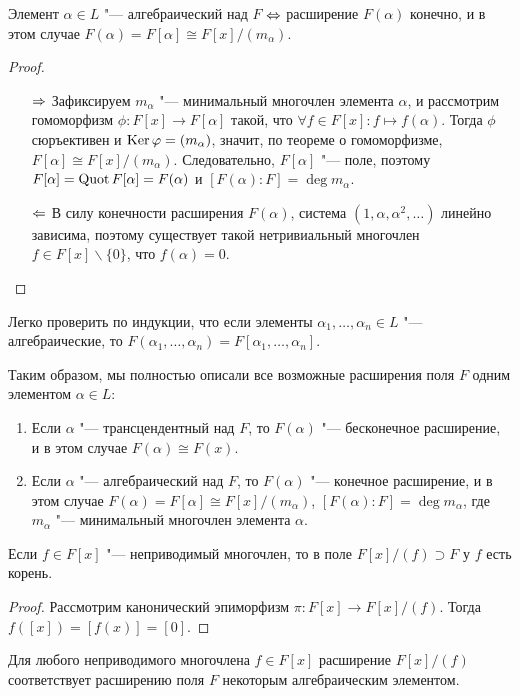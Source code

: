 \begin{theorem}
	Элемент $\alpha \in L$ "--- алгебраический над $F$ $\Leftrightarrow$ расширение $F(\alpha)$ конечно, и в этом случае $F(\alpha) = F[\alpha] \cong F[x]/(m_\alpha)$.
\end{theorem}

\begin{proof}~
	\begin{itemize}
		\item[$\Rightarrow$] Зафиксируем $m_\alpha$ "--- минимальный многочлен элемента $\alpha$, и рассмотрим гомоморфизм $\phi: F[x] \to F[\alpha]$ такой, что $\forall f \in F[x]: f \mapsto f(\alpha)$. Тогда $\phi$ сюръективен и $\operatorname{Ker}\varphi = (m_\alpha)$, значит, по теореме о гомоморфизме, $F[\alpha] \cong F[x] / (m_\alpha)$. Следовательно, $F[\alpha]$ "--- поле, поэтому $F[\alpha] = \operatorname{Quot} F[\alpha] = F(\alpha)$ и $[F(\alpha) : F] = \deg{m_\alpha}$.
		
		\item[$\Leftarrow$] В силу конечности расширения $F(\alpha)$, система $(1, \alpha, \alpha^2, \dotsc)$ линейно зависима, поэтому существует такой нетривиальный многочлен $f \in F[x] \backslash \{0\}$, что $f(\alpha) = 0$.\qedhere
	\end{itemize}
\end{proof}

\begin{note}
	Легко проверить по индукции, что если элементы $\alpha_1, \dotsc, \alpha_n \in L$ "--- алгебраические, то $F(\alpha_1, \dotsc, \alpha_n) = F[\alpha_1, \dotsc, \alpha_n]$.
\end{note}

\begin{note}
	Таким образом, мы полностью описали все возможные расширения поля $F$ одним элементом $\alpha \in L$:
	\begin{enumerate}
		\item Если $\alpha$ "--- трансцендентный над $F$, то $F(\alpha)$ "--- бесконечное расширение, и в этом случае $F(\alpha) \cong F(x)$.
		\item Если $\alpha$ "--- алгебраический над $F$, то $F(\alpha)$ "--- конечное расширение, и в этом случае $F(\alpha) = F[\alpha]  \cong F[x] / (m_\alpha)$, $[F(\alpha) : F] = \deg{m_\alpha}$, где $m_\alpha$ "--- минимальный многочлен элемента $\alpha$.
	\end{enumerate}
\end{note}

\begin{proposition}
	Если $f \in F[x]$ "--- неприводимый многочлен, то в поле $F[x] / (f) \supset F$ у $f$ есть корень.
\end{proposition}

\begin{proof}
	Рассмотрим канонический эпиморфизм $\pi: F[x] \to F[x] / (f)$. Тогда $f([x]) = [f(x)] = [0]$.
\end{proof}

\begin{corollary}
	Для любого неприводимого многочлена $f \in F[x]$ расширение $F[x] / (f)$ соответствует расширению поля $F$ некоторым алгебраическим элементом.
\end{corollary}